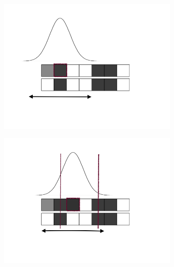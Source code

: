 \begin{figure}
\begin{subfigure}[t]{0.3\linewidth}
  \end{subfigure}
  \hfill
    \begin{subfigure}[t]{0.3\linewidth}
    \centering
    \includegraphics[width=\textwidth]{blurring3.png}
  \end{subfigure}
  \vfill
  \begin{subfigure}[t]{0.3\linewidth}
    \centering
    \includegraphics[width=\textwidth]{blurring4.png}
  \end{subfigure}
  \hfill
  \begin{subfigure}[t]{0.3\linewidth}
    \centering

\end{subfigure}
\end{figure}
